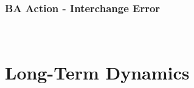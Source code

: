 \documentclass[14pt, unknownkeysallowed]{beamer}
\begin{document}
\begin{frame}
\frametitle{BA Action - Interchange Error} \ \vspace{.5em}
\end{frame}

\section{Long-Term Dynamics}
\end{document}
